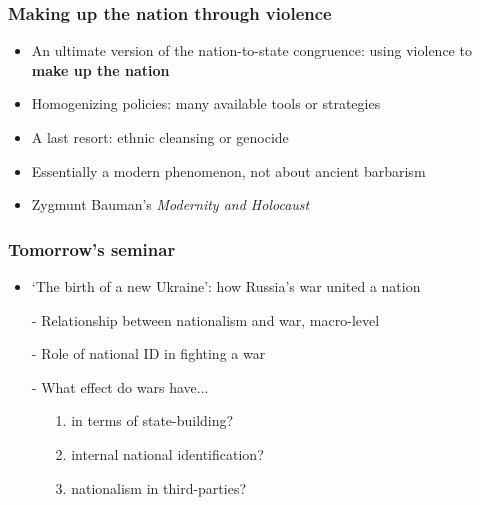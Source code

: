 \documentclass[aspectratio=43]{beamer}
\begin{document}
\begin{frame}
\frametitle{Making up the nation through violence}
\centering

\begin{itemize}
  \item An ultimate version of the nation-to-state congruence: using violence to \textbf{make up the nation}
  \item Homogenizing policies: many available tools or strategies
  \item A last resort: ethnic cleansing or genocide
  \item Essentially a modern phenomenon, not about ancient barbarism
  \item Zygmunt Bauman's \textit{Modernity and Holocaust}
\end{itemize}

\end{frame}


\begin{frame}
\frametitle{Tomorrow's seminar}
\centering

\begin{itemize}
  \item `The birth of a new Ukraine': how Russia's war united a nation
  \item[]
  \item[-] Relationship between nationalism and war, macro-level
  \item[-] Role of national ID in fighting a war
  \item[-] What effect do wars have...
  \begin{itemize}
    \item[1.] in terms of state-building?
    \item[2.] internal national identification?
    \item[3.] nationalism in third-parties?
  \end{itemize}
\end{itemize}

\end{frame}
\end{document}
